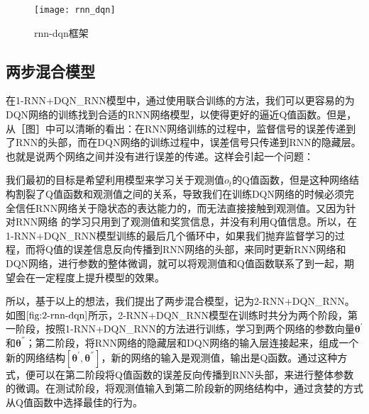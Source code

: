 \begin{figure}[htbp]
\centering
\texttt{[image: rnn\_dqn]}
\caption{rnn-dqn框架}
\label{fig:rnn_dqn}
\end{figure}



\subsection{两步混合模型}
在1-RNN+DQN\_RNN模型中，通过使用联合训练的方法，我们可以更容易的为DQN网络的训练找到合适的RNN网络模型，以使得更好的逼近Q值函数。但是，从［图］中可以清晰的看出：在RNN网络训练的过程中，监督信号的误差传递到了RNN的头部，而在DQN网络的训练过程中，误差信号只传递到RNN的隐藏层。也就是说两个网络之间并没有进行误差的传递。这样会引起一个问题：

我们最初的目标是希望利用模型来学习关于观测值$o_{t}$的Q值函数，但是这种网络结构割裂了Q值函数和观测值之间的关系，导致我们在训练DQN网络的时候必须完全信任RNN网络关于隐状态的表达能力的，而无法直接接触到观测值。又因为针对RNN网络
的学习只用到了观测值和奖赏信息，并没有利用Q值信息。所以，在1-RNN+DQN\_RNN模型训练的最后几个循环中，如果我们抛弃监督学习的过程，而将Q值的误差信息反向传播到RNN网络的头部，来同时更新RNN网络和DQN网络，进行参数的整体微调，就可以将观测值和Q值函数联系了到一起，期望会在一定程度上提升模型的效果。



所以，基于以上的想法，我们提出了两步混合模型，记为2-RNN+DQN\_RNN。如图$\ref{fig:2-rnn-dqn}$所示，2-RNN+DQN\_RNN模型在训练时共分为两个阶段，第一阶段，按照1-RNN+DQN\_RNN的方法进行训练，学习到两个网络的参数向量$\bm{\theta}^{'}$和$\bm{\theta}^{''}$；第二阶段，将RNN网络的隐藏层和DQN网络的输入层连接起来，组成一个新的网络结构$[\bm{\theta}^{'},\bm{\theta}^{''}]$，新的网络的输入是观测值，输出是Q函数。通过这种方式，便可以在第二阶段将Q值函数的误差反向传播到RNN头部，来进行整体参数的微调。在测试阶段，将观测值输入到第二阶段新的网络结构中，通过贪婪的方式从Q值函数中选择最佳的行为。

